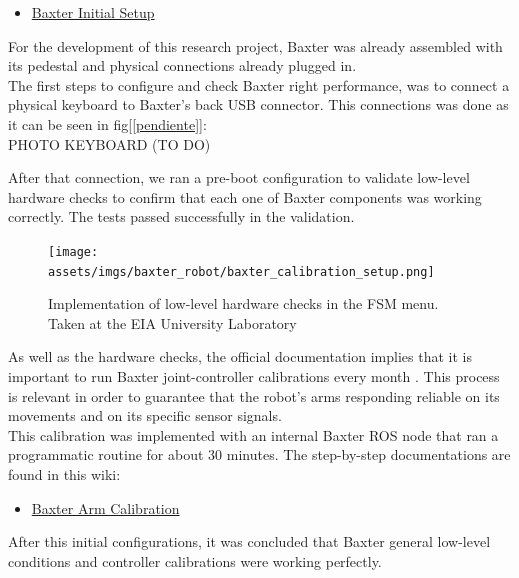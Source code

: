 \documentclass[11pt]{report} %
\begin{document}
\begin{itemize}
    \color{blue}
    \item \href{https://sdk.rethinkrobotics.com/wiki/Getting_Started}{Baxter Initial Setup}
\end{itemize}

For the development of this research project, Baxter was already assembled with its pedestal and physical connections already plugged in.\\

The first steps to configure and check Baxter right performance, was to connect a physical keyboard to Baxter's back USB connector. This connections was done as it can be seen in fig[\ref{pendiente}]:\\

PHOTO KEYBOARD (TO DO)


After that connection, we ran a pre-boot configuration to validate low-level hardware checks to confirm that each one of Baxter components was working correctly. The tests passed successfully in the validation.\\

\begin{figure}[H]
    \centering
    \texttt{[image: assets/imgs/baxter\_robot/baxter\_calibration\_setup.png]}
    \caption{Implementation of low-level hardware checks in the FSM menu. Taken at the EIA University Laboratory} 
    \label{fig_low_level_checks_fsm}
\end{figure}


As well as the hardware checks, the official documentation implies that it is important to run Baxter joint-controller calibrations every month \citep{cite_baxter_arms_calibartion}. This process is relevant in order to guarantee that the robot's arms responding reliable on its movements and on its specific sensor signals.\\

This calibration was implemented with an internal Baxter ROS node that ran a programmatic routine for about 30 minutes. The step-by-step documentations are found in this wiki:

\begin{itemize}
    \color{blue}
    \item \href{https://sdk.rethinkrobotics.com/wiki/Arm_Calibration}{Baxter Arm Calibration}
\end{itemize}

After this initial configurations, it was concluded that Baxter general low-level conditions and controller calibrations were working perfectly.\\
\end{document}
